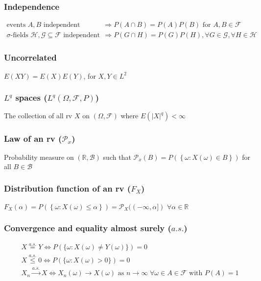 \documentclass{article}
\newcommand{\abs}[1]{\lvert#1\rvert}
\begin{document}
\subsubsection{Independence}
\begin{align*}
  \textrm{events }A, B \textrm{ independent} &\Longrightarrow P(A \cap B) = P(A)P(B) \textrm{ for } A, B \in \mathcal{F}\\
  \sigma\textrm{-fields } \mathcal{H}, \mathcal{G} \subseteq \mathcal{F} \textrm{ independent} &\Longrightarrow P(G \cap H) = P(G)P(H), \forall G\in\mathcal{G}, \forall H\in\mathcal{H}
\end{align*}

\subsubsection{Uncorrelated}
$E(XY) = E(X)E(Y)$, for $X,Y \in L^2$ 

\subsubsection{$L^q$ spaces ($L^q(\Omega, \mathcal{F}, P)$)}
The collection of all rv $X$ on $(\Omega, \mathcal{F})$ where $E(\abs{X}^q) < \infty$

\subsubsection{Law of an rv ($\mathcal{P}_x$)}
Probability measure on $(\mathbb{R}, \mathcal{B})$ such that $\mathcal{P}_x(B) = P(\left\{\omega: X(\omega) \in B\right\})$ for all $B \in \mathcal{B}$

\subsubsection{Distribution function of an rv ($F_X$)}
$F_X(\alpha) = P(\left\{\omega: X(\omega) \leq \alpha \right\}) = \mathcal{P}_X((-\infty, \alpha])$ $\forall \alpha \in \mathbb{R}$

\subsubsection{Convergence and equality almost surely ($a.s.$)}
\begin{align*}
  & X \overset{a.s.}{=} Y \Longleftrightarrow P(\{\omega : X(\omega) \neq Y(\omega)\}) = 0 \\
  & X \overset{a.s.}{\leq} 0 \Longleftrightarrow P(\{\omega : X(\omega) > 0\}) = 0\\
  & X_n \overset{a.s.}{\rightarrow} X \Longleftrightarrow X_n(\omega) \rightarrow X(\omega) \textrm{ as } n\rightarrow \infty \; \forall \omega \in A \in \mathcal{F} \textrm{ with } P(A) = 1
\end{align*}
\end{document}
